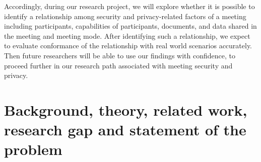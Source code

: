 \begin{spacing}{1.0}
    \par Accordingly, during our research project, we will explore whether it is possible to identify a relationship among security and privacy-related factors of a meeting including participants, capabilities of participants, documents, and data shared in the meeting and meeting mode. After identifying such a relationship, we expect to evaluate conformance of the relationship with real world scenarios accurately. Then future researchers will be able to use our findings with confidence, to proceed further in our research path associated with meeting security and privacy.

    \section{Background, theory, related work, research gap and statement of the problem}


\end{spacing}
